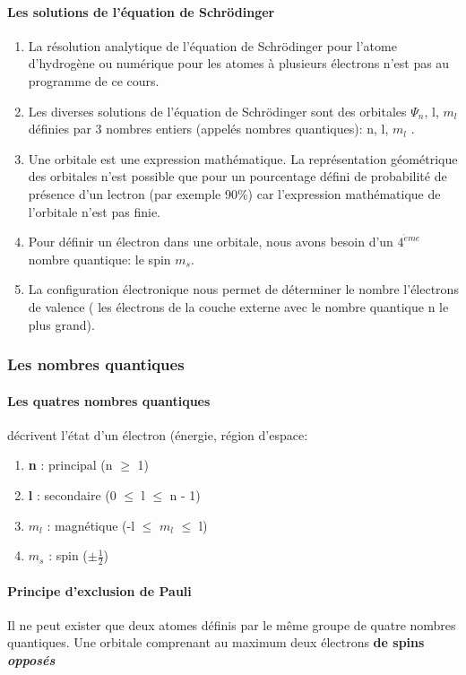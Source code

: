 \documentclass[10pt,a4paper]{book}
\begin{document}
\paragraph{Les solutions de l'équation de Schrödinger}
\begin{enumerate}
\item La résolution analytique de l’équation de Schrödinger pour l’atome d’hydrogène ou numérique pour les atomes à plusieurs électrons n’est pas au programme de ce cours.
\item Les diverses solutions de l’équation de Schrödinger sont des orbitales $\Psi_n$, l, $m_l$ définies par 3 nombres entiers (appelés nombres quantiques): n, l, $m_l$ .
\item Une orbitale est une expression mathématique. La représentation géométrique des orbitales n’est possible que pour un pourcentage défini de probabilité de présence d’un lectron (par exemple 90\%) car l’expression mathématique de l’orbitale n’est pas finie.
\item  Pour définir un électron dans une orbitale, nous avons besoin d’un $4^{\grave{e}me}$ nombre quantique: le spin $m_s$. \label{spin}
\item  La configuration électronique nous permet de déterminer le nombre l'électrons de valence ( les électrons de la couche externe avec le nombre quantique n le plus grand).
\end{enumerate}

\subsubsection{Les nombres quantiques}

\paragraph{Les quatres nombres quantiques} décrivent l'état d'un électron (énergie, région d'espace:
\begin{enumerate}
\item \textbf{n} : principal (n $\geq$ 1)
\item \textbf{l} : secondaire (0 $\leq$ l $\leq$ n - 1) 
\item \textbf{$m_l$} : magnétique (-l $\leq$ $m_l$ $\leq$ l)
\item \textbf{$m_s$} : spin ($\pm \frac{1}{2}$)
\end{enumerate}
\paragraph{Principe d'exclusion de Pauli} Il ne peut exister que deux atomes définis par le même groupe de quatre nombres quantiques. Une orbitale comprenant au maximum deux électrons \textbf{de spins \textit{opposés}} \label{eq:1}
\end{document}
